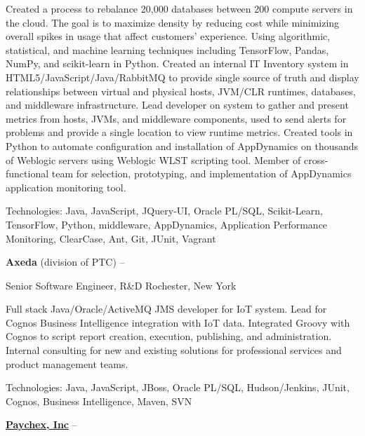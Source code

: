 \documentclass[letterpaper,MMMMyyyy,nonstopmode]{simpleresumecv}
\begin{document}
\begin{Body}
\begin{Detail}
\BulletItem
Created a process to rebalance 20,000 databases between 200 compute servers in the cloud. The goal is to maximize density by reducing cost while minimizing overall spikes in usage that affect customers' experience. Using algorithmic, statistical, and machine learning techniques including TensorFlow, Pandas, NumPy, and scikit-learn in Python.
\BulletItem
Created an internal IT Inventory system in HTML5/JavaScript/Java/RabbitMQ to provide single source of truth and display relationships between virtual and physical hosts, JVM/CLR runtimes, databases, and middleware infrastructure.
\BulletItem
Lead developer on system to gather and present metrics from hosts, JVMs, and middleware components, used to send alerts for problems and provide a single location to view runtime metrics.
\BulletItem
Created tools
in Python to automate configuration and installation of AppDynamics on thousands of Weblogic servers using Weblogic WLST
scripting tool.
\BulletItem
Member of cross-functional team for selection, prototyping, and implementation of AppDynamics application monitoring tool. 

\Gap
Technologies: Java, JavaScript, JQuery-UI, Oracle PL/SQL, Scikit-Learn, TensorFlow, Python, middleware, AppDynamics, Application Performance Monitoring, ClearCase, Ant, Git, JUnit, Vagrant
\end{Detail}
\fi

\BigGap

\Entry
\textbf{Axeda} (division of PTC)
\hfill 
{} --  

Senior Software Engineer, R\&D
\hfill
Rochester, New York

\begin{Detail}
\BulletItem
Full stack Java/Oracle/ActiveMQ JMS developer for IoT system.
\BulletItem
Lead for Cognos Business Intelligence integration with IoT data. Integrated Groovy with Cognos to script report creation, execution, publishing, and administration.
\BulletItem
Internal consulting for new and existing solutions for professional services and product management teams.

\Gap
Technologies: Java, JavaScript, JBoss, Oracle PL/SQL, Hudson/Jenkins, JUnit, Cognos, Business Intelligence, Maven, SVN
\end{Detail}

\BigGap
\Entry
\href{http://www.paychex.com/}
{\textbf{Paychex, Inc}}
\hfill 
 -- 


\end{Body}
\end{document}
